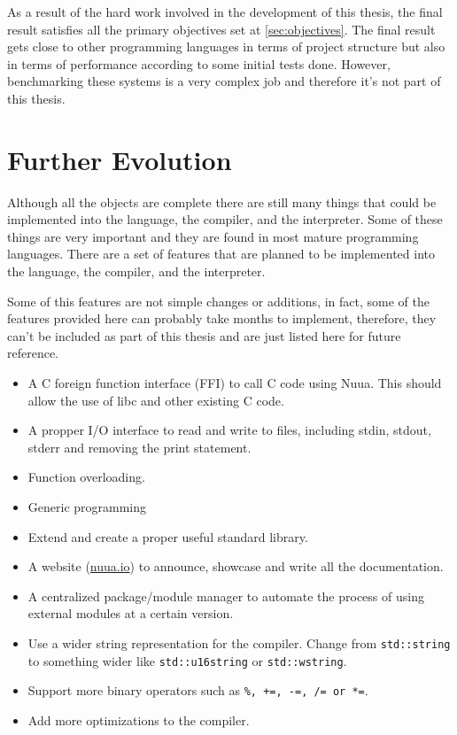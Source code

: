 As a result of the hard work involved in the development of this thesis, the final result satisfies all the primary objectives set at \autoref{sec:objectives}.
The final result gets close to other programming languages in terms of project structure but also in terms of performance according to some initial
tests done. However, benchmarking these systems is a very complex job and therefore it's not part of this thesis.

\section{Further Evolution}
\label{sec:forthcoming}

Although all the objects are complete there are still many things that could be implemented into the language, the compiler, and the interpreter.
Some of these things are very important and they are found in most mature programming languages. There are a set of features that are planned to be
implemented into the language, the compiler, and the interpreter.

Some of this features are not simple changes or additions, in fact, some of the features provided here can probably take months to implement,
therefore, they can't be included as part of this thesis and are just listed here for future reference.

\begin{itemize}
    \item A C foreign function interface (FFI) to call C code using Nuua. This should allow the use of libc and other existing C code.
    \item A propper I/O interface to read and write to files, including stdin, stdout, stderr and removing the print statement.
    \item Function overloading.
    \item Generic programming
    \item Extend and create a proper useful standard library.
    \item A website (\href{https://nuua.io}{nuua.io}) to announce, showcase and write all the documentation.
    \item A centralized package/module manager to automate the process of using external modules at a certain version.
    \item Use a wider string representation for the compiler. Change from \texttt{std::string} to something wider like
        \texttt{std::u16string} or \texttt{std::wstring}.
    \item Support more binary operators such as \texttt{\%, +=, -=, /= or *=}.
    \item Add more optimizations to the compiler.
\end{itemize}

